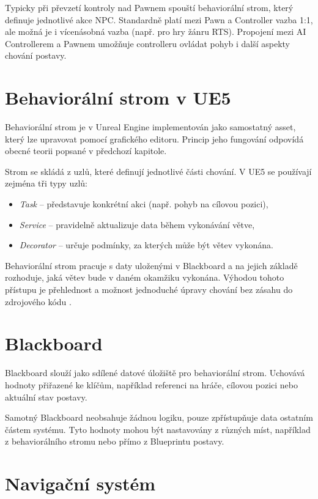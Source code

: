 Typicky při převzetí kontroly nad Pawnem spouští behaviorální strom, který definuje jednotlivé akce NPC. 
Standardně platí mezi Pawn a Controller vazba 1:1, ale možná je i vícenásobná vazba (např. pro hry žánru RTS).
Propojení mezi AI Controllerem a Pawnem umožňuje controlleru ovládat pohyb i další aspekty chování postavy.

\section{Behaviorální strom v UE5}

Behaviorální strom je v Unreal Engine implementován jako samostatný asset, který lze upravovat pomocí grafického editoru.\cite{epic_bt} 
Princip jeho fungování odpovídá obecné teorii popsané v předchozí kapitole.

Strom se skládá z uzlů, které definují jednotlivé části chování. 
V UE5 se používají zejména tři typy uzlů:
\begin{itemize}
    \item \textit{Task} – představuje konkrétní akci (např. pohyb na cílovou pozici),
    \item \textit{Service} – pravidelně aktualizuje data během vykonávání větve,
    \item \textit{Decorator} – určuje podmínky, za kterých může být větev vykonána.
\end{itemize}

Behaviorální strom pracuje s daty uloženými v Blackboard a na jejich základě rozhoduje, jaká větev bude v daném okamžiku vykonána. 
Výhodou tohoto přístupu je přehlednost a možnost jednoduché úpravy chování bez zásahu do zdrojového kódu \cite[s.~80]{butler2023}.

\section{Blackboard}

Blackboard slouží jako sdílené datové úložiště pro behaviorální strom. 
Uchovává hodnoty přiřazené ke klíčům, například referenci na hráče, cílovou pozici nebo aktuální stav postavy.\cite{epic_bt} 

Samotný Blackboard neobsahuje žádnou logiku, pouze zpřístupňuje data ostatním částem systému. 
Tyto hodnoty mohou být nastavovány z různých míst, například z behaviorálního stromu nebo přímo z Blueprintu postavy.

\section{Navigační systém}

